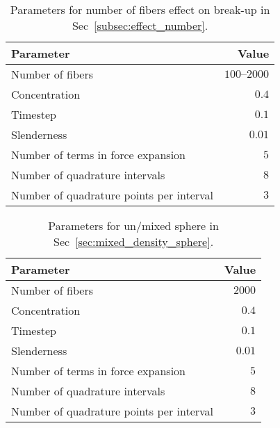 \begin{table}[!htbp]
  \caption*{Parameters for number of fibers effect on break-up in Sec~\ref{subsec:effect_number}.}
  \begin{center}
    \begin{tabulary}{\textwidth}{LR}
      \toprule
      Parameter & Value \\
      \midrule
      Number of fibers & $100–2000$ \\
      Concentration & $0.4$ \\
      Timestep & $0.1$ \\
      Slenderness & $0.01$ \\
      Number of terms in force expansion & $5$ \\
      Number of quadrature intervals & $8$ \\
      Number of quadrature points per interval & $3$ \\
      \bottomrule
    \end{tabulary}
  \end{center}
\end{table}

\begin{table}[!htbp]
  \caption*{Parameters for un/mixed sphere in Sec~\ref{sec:mixed_density_sphere}.}
  \begin{center}
    \begin{tabulary}{\textwidth}{LR}
      \toprule
      Parameter & Value \\
      \midrule
      Number of fibers & $2000$ \\
      Concentration & $0.4$ \\
      Timestep & $0.1$ \\
      Slenderness & $0.01$ \\
      Number of terms in force expansion & $5$ \\
      Number of quadrature intervals & $8$ \\
      Number of quadrature points per interval & $3$ \\
      \bottomrule
    \end{tabulary}
  \end{center}
\end{table}
